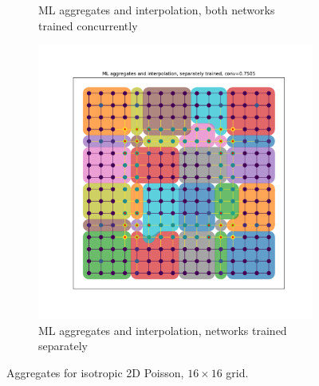 \documentclass{article}
\begin{document}
\begin{figure}[b]
\begin{subfigure}[b]{0.49\textwidth}
    \caption{ML aggregates and interpolation, both networks trained concurrently}
  \end{subfigure}
  \begin{subfigure}[b]{0.49\textwidth}
    \centering
    \includegraphics[width=\textwidth]{isotropic_full_separate.pdf}
    \caption{ML aggregates and interpolation, networks trained separately}
  \end{subfigure}
  \caption{Aggregates for isotropic 2D Poisson, $16 \times 16$ grid.}
  \label{fig:2d_isotropic}
\end{figure}
\end{document}
